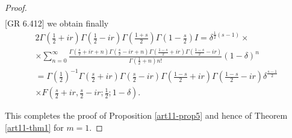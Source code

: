 \begin{proof}
\begin{gather*}
\end{gather*}
[GR 6.412] we obtain finally
\begin{gather*}
2 \Gamma \left(\frac{1}{2} + ir \right) \Gamma \left(\frac{1}{2} - ir \right) \Gamma \left(\frac{1+s}{2} \right) \Gamma \left( 1-\frac{s}{2}\right) I = \delta^{\frac{1}{2} (s-1)} \times \\
\times \sum\limits^\infty_{n=0}  \frac{\Gamma \left(\frac{s}{2} + ir + n \right) \Gamma \left(\frac{s}{2} - ir + n\right) \Gamma \left(\frac{1-s}{2}+ ir \right) \Gamma \left(\frac{1-s}{2} - ir \right)}{\Gamma \left(\frac{1}{2} +n \right) n!} (1-\delta)^n\\
= \Gamma \left(\frac{1}{2}  \right)^{-1} \Gamma \left(\frac{s}{2} +ir \right)  \Gamma \left(\frac{s}{2} - ir \right) \Gamma \left(\frac{1-s}{2} + ir \right) \Gamma \left(\frac{1-s}{2}- ir \right) \delta^{\frac{s-1}{2}}\\
 \times  F \left(\frac{s}{2} + ir , \frac{s}{2} - ir ; \frac{1}{2}; 1 - \delta \right).
\end{gather*}\pageoriginale

This completes the proof of Proposition \ref{art11-prop5} and hence of Theorem \eqref{art11-thm1} for $m=1$. 


\end{proof}
